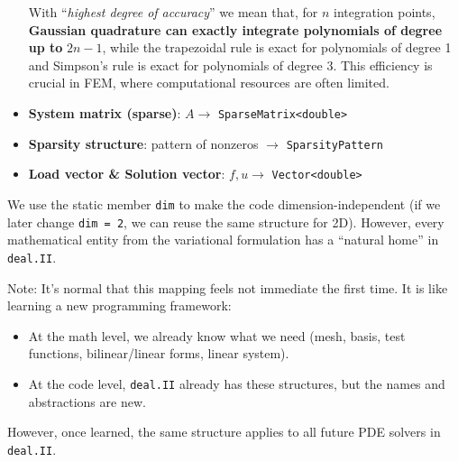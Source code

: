 \begin{itemize}
    With ``\emph{highest degree of accuracy}'' we mean that, for $n$ integration points, \textbf{Gaussian quadrature can exactly integrate polynomials of degree up to} $2n-1$, while the trapezoidal rule is exact for polynomials of degree 1 and Simpson's rule is exact for polynomials of degree 3. This efficiency is crucial in FEM, where computational resources are often limited.
    \item \textbf{System matrix (sparse)}: $A \rightarrow$ \texttt{SparseMatrix<double>}
    \item \textbf{Sparsity structure}: pattern of nonzeros $\rightarrow$ \texttt{SparsityPattern}
    \item \textbf{Load vector \& Solution vector}: $f, u \rightarrow$ \texttt{Vector<double>}
\end{itemize}
We use the static member \texttt{dim} to make the code dimension-independent (if we later change \texttt{dim = 2}, we can reuse the same structure for 2D). However, every mathematical entity from the variational formulation has a ``natural home'' in \texttt{deal.II}.

\newpage

\noindent
Note: It's normal that this mapping feels not immediate the first time. It is like learning a new programming framework:
\begin{itemize}
    \item At the math level, we already know what we need (mesh, basis, test functions, bilinear/linear forms, linear system).
    \item At the code level, \texttt{deal.II} already has these structures, but the names and abstractions are new.
\end{itemize}
However, once learned, the same structure applies to all future PDE solvers in \texttt{deal.II}.

